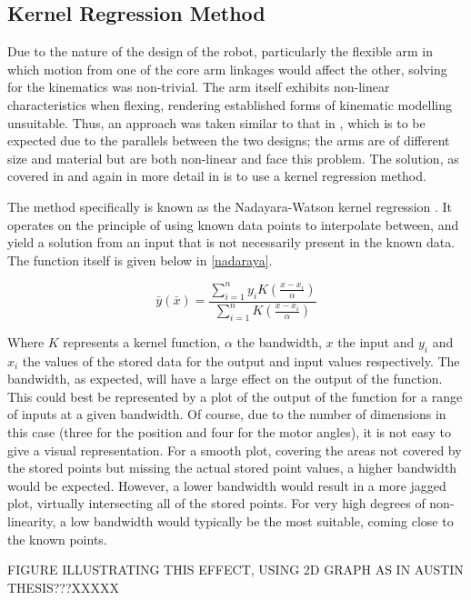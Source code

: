 \documentclass[11pt]{article}
\begin{document}
\subsection{Kernel Regression Method}
Due to the nature of the design of the robot, particularly the flexible arm in which motion from one of the core arm linkages would affect the other, solving for the kinematics was non-trivial. The arm itself exhibits non-linear characteristics when flexing, rendering established forms of kinematic modelling unsuitable. Thus, an approach was taken similar to that in \cite{GreggSmithDesign}, which is to be expected due to the parallels between the two designs; the arms are of different size and material but are both non-linear and face this problem. The solution, as covered in \cite{GreggSmithDesign} and again in more detail in \cite{GreggSmithPhd} is to use a kernel regression method.

The method specifically is known as the Nadayara-Watson kernel regression \cite{nadaraya1964}. It operates on the principle of using known data points to interpolate between, and yield a solution from an input that is not necessarily present in the known data. The function itself is given below in \eqref{nadaraya}.

\begin{equation}\label{nadaraya}
\bar{y}(\bar{x}) = \frac{\sum_{i=1}^{n}y_{i}K(\frac{x - x_{i}}{\alpha})}{\sum_{i=1}^{n}K(\frac{x - x_{i}}{\alpha})}
\end{equation}

Where $K$ represents a kernel function, $\alpha$ the bandwidth, $x$ the input and $y_{i}$ and $x_{i}$ the values of the stored data for the output and input values respectively. The bandwidth, as expected, will have a large effect on the output of the function. This could best be represented by a plot of the output of the function for a range of inputs at a given bandwidth. Of course, due to the number of dimensions in this case (three for the position and four for the motor angles), it is not easy to give a visual representation. For a smooth plot, covering the areas not covered by the stored points but missing the actual stored point values, a higher bandwidth would be expected. However, a lower bandwidth would result in a more jagged plot, virtually intersecting all of the stored points. For very high degrees of non-linearity, a low bandwidth would typically be the most suitable, coming close to the known points. 

FIGURE ILLUSTRATING THIS EFFECT, USING 2D GRAPH AS IN AUSTIN THESIS???XXXXX
\end{document}
